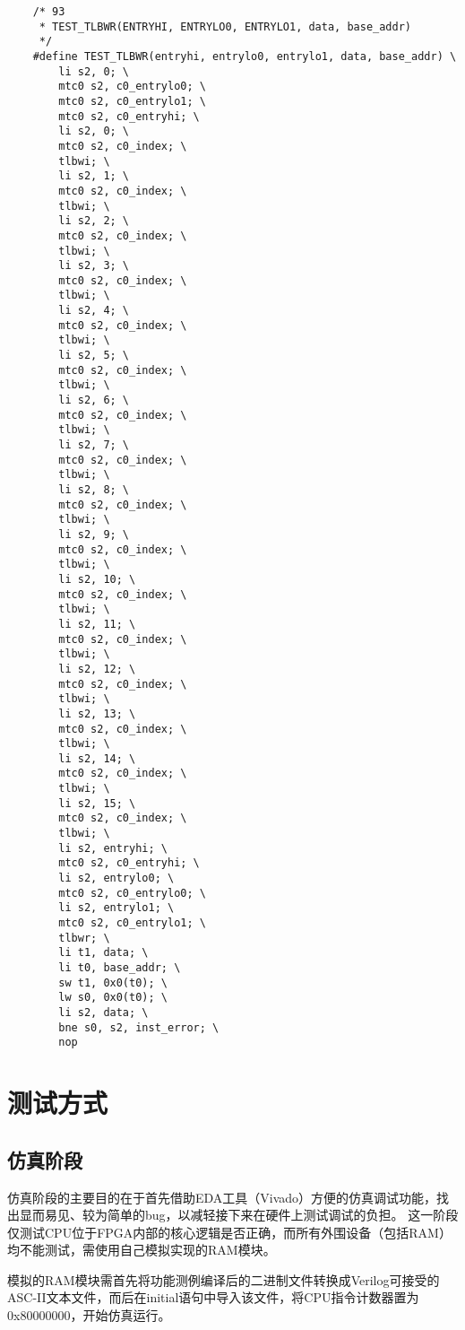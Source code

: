 \begin{enumerate}
    \begin{lstlisting}
    /* 93
     * TEST_TLBWR(ENTRYHI, ENTRYLO0, ENTRYLO1, data, base_addr)
     */
    #define TEST_TLBWR(entryhi, entrylo0, entrylo1, data, base_addr) \
    	li s2, 0; \
    	mtc0 s2, c0_entrylo0; \
    	mtc0 s2, c0_entrylo1; \
    	mtc0 s2, c0_entryhi; \
    	li s2, 0; \
    	mtc0 s2, c0_index; \
    	tlbwi; \
    	li s2, 1; \
    	mtc0 s2, c0_index; \
    	tlbwi; \
    	li s2, 2; \
    	mtc0 s2, c0_index; \
    	tlbwi; \
    	li s2, 3; \
    	mtc0 s2, c0_index; \
    	tlbwi; \
    	li s2, 4; \
    	mtc0 s2, c0_index; \
    	tlbwi; \
    	li s2, 5; \
    	mtc0 s2, c0_index; \
    	tlbwi; \
    	li s2, 6; \
    	mtc0 s2, c0_index; \
    	tlbwi; \
    	li s2, 7; \
    	mtc0 s2, c0_index; \
    	tlbwi; \
    	li s2, 8; \
    	mtc0 s2, c0_index; \
    	tlbwi; \
    	li s2, 9; \
    	mtc0 s2, c0_index; \
    	tlbwi; \
    	li s2, 10; \
    	mtc0 s2, c0_index; \
    	tlbwi; \
    	li s2, 11; \
    	mtc0 s2, c0_index; \
    	tlbwi; \
    	li s2, 12; \
    	mtc0 s2, c0_index; \
    	tlbwi; \
    	li s2, 13; \
    	mtc0 s2, c0_index; \
    	tlbwi; \
    	li s2, 14; \
    	mtc0 s2, c0_index; \
    	tlbwi; \
    	li s2, 15; \
    	mtc0 s2, c0_index; \
    	tlbwi; \
    	li s2, entryhi; \
    	mtc0 s2, c0_entryhi; \
    	li s2, entrylo0; \
    	mtc0 s2, c0_entrylo0; \
    	li s2, entrylo1; \
    	mtc0 s2, c0_entrylo1; \
    	tlbwr; \
    	li t1, data; \
    	li t0, base_addr; \
    	sw t1, 0x0(t0); \
    	lw s0, 0x0(t0); \
        li s2, data; \
        bne s0, s2, inst_error; \
        nop
    \end{lstlisting}

\end{enumerate}

\section{测试方式}

\subsection{仿真阶段}

仿真阶段的主要目的在于首先借助EDA工具（Vivado）方便的仿真调试功能，找出显而易见、较为简单的bug，以减轻接下来在硬件上测试调试的负担。
这一阶段仅测试CPU位于FPGA内部的核心逻辑是否正确，而所有外围设备（包括RAM）均不能测试，需使用自己模拟实现的RAM模块。

模拟的RAM模块需首先将功能测例编译后的二进制文件转换成Verilog可接受的ASC-II文本文件，而后在initial语句中导入该文件，将CPU指令计数器置为0x80000000，开始仿真运行。

